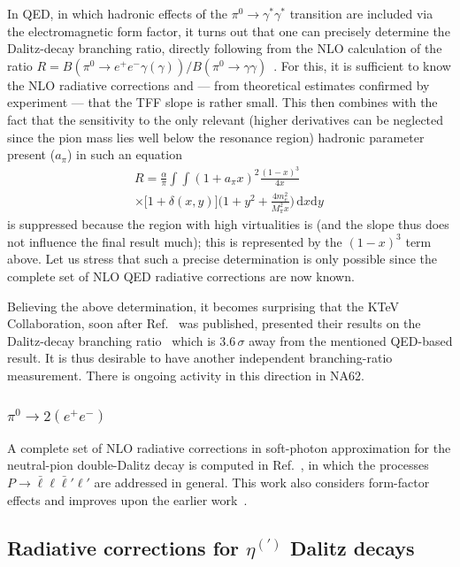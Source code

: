 In QED, in which hadronic effects of the $\pi^0\to\gamma^*\gamma^*$ transition are included via the electromagnetic form factor, it turns out that one can precisely determine the Dalitz-decay branching ratio, directly following from the NLO calculation of the ratio \mbox{$R=B(\pi^0\to e^+e^-\gamma(\gamma))/B(\pi^0\to\gamma\gamma)$}~\cite{Husek:2018qdx}.
For this, it is sufficient to know the NLO radiative corrections and --- from theoretical estimates confirmed by experiment --- that the TFF slope is rather small.
This then combines with the fact that the sensitivity to the only relevant (higher derivatives can be neglected since the pion mass lies well below the resonance region) hadronic parameter present ($a_\pi$) in such an equation
%
\begin{multline}
    R
    =\frac\alpha\pi\int\!\!\!\!\int(1+a_\pi x)^2\frac{(1-x)^3}{4x}\\
    \times\big[1+\delta(x,y)\big]\biggl(1+y^2+\frac{4m_e^2}{M_\pi^2x}\biggr)\,\mathrm{d}x\mathrm{d}y\,
\end{multline}
%
is suppressed because the region with high virtualities is (and the slope thus does not influence the final result much); this is represented by the $(1-x)^3$ term above.
Let us stress that such a precise determination is only possible since the complete set of NLO QED radiative corrections are now known.

Believing the above determination, it becomes surprising that the KTeV Collaboration, soon after Ref.~\cite{Husek:2018qdx} was published, presented their results on the Dalitz-decay branching ratio~\cite{KTeV:2019gud} which is 3.6\,$\sigma$ away from the mentioned QED-based result.
It is thus desirable to have another independent branching-ratio measurement.
There is ongoing activity in this direction in NA62.


\subsubsection{\texorpdfstring{$\pi^0\to 2(e^+e^-)$}{pi0->4e}}

A complete set of NLO radiative corrections in soft-photon approximation for the neutral-pion double-Dalitz decay is computed in Ref.~\cite{Kampf:2018wau}, in which the processes $P\to\bar\ell\ell\bar\ell'\ell'$ are addressed in general.
This work also considers form-factor effects and improves upon the earlier work~\cite{Barker:2002ib}.


\subsection[\texorpdfstring{$\eta^{(\prime)}$}{eta(')} Dalitz decays]{Radiative corrections for \texorpdfstring{$\eta^{(\prime)}$}{eta(')} Dalitz decays}

